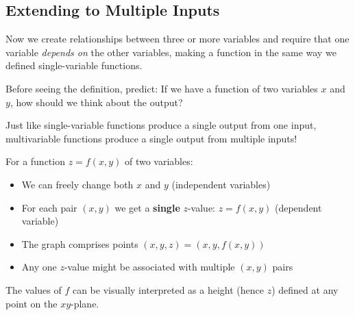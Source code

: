 \documentclass{ximera}
\begin{document}
\subsection*{Extending to Multiple Inputs}

Now we create relationships between three or more variables and require that one variable \emph{depends on} the other variables, making a function in the same way we defined single-variable functions.

\begin{problem}
Before seeing the definition, predict: If we have a function of two variables $x$ and $y$, how should we think about the output?

\begin{multipleChoice}
\end{multipleChoice}

\begin{feedback}
Just like single-variable functions produce a single output from one input, multivariable functions produce a single output from multiple inputs!
\end{feedback}
\end{problem}

\begin{definition}
For a function $z = f(x, y)$ of two variables:
\begin{itemize}
    \item We can freely change both $x$ and $y$ (independent variables)
    \item For each pair $(x, y)$ we get a \textbf{single} $z$-value: $z = f(x, y)$ (dependent variable)
    \item The graph comprises points $(x, y, z) = (x, y, f(x, y))$
    \item Any one $z$-value might be associated with multiple $(x, y)$ pairs
\end{itemize}

The values of $f$ can be visually interpreted as a height (hence $z$) defined at any point on the $xy$-plane.
\end{definition}
\end{document}
